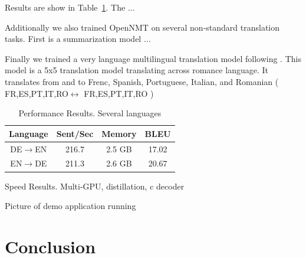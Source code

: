 \documentclass[11pt]{article}
\begin{document}
Results are show in Table~\ref{tab:res}. The ...


Additionally we also trained OpenNMT on several non-standard
translation tasks. First is a summarization model \cite{} ...

Finally we trained a very language multilingual translation 
model following . This model is a 5x5 translation 
model translating across romance language. It translates from and to 
Frenc, Spanish, Portuguese, Italian, and Romanian ( FR,ES,PT,IT,RO$\leftrightarrow$ FR,ES,PT,IT,RO  )









\begin{table}
  \centering
  \begin{tabular}{cccc}
    \toprule
     Language & Sent/Sec & Memory & BLEU \\
    \midrule
    DE$\rightarrow$EN& 216.7 & 2.5 GB & 17.02\\
    EN$\rightarrow$DE& 211.3 & 2.6 GB & 20.67 \\
    \midrule

    \bottomrule
  \end{tabular}
  \label{tab:res}
  \caption{Performance Results. Several languages}
\end{table}


\begin{table}
  \centering
  
  \caption{Speed Results. Multi-GPU, distillation, c decoder}
\end{table}

Picture of demo application running 

\section{Conclusion}




\end{document}
